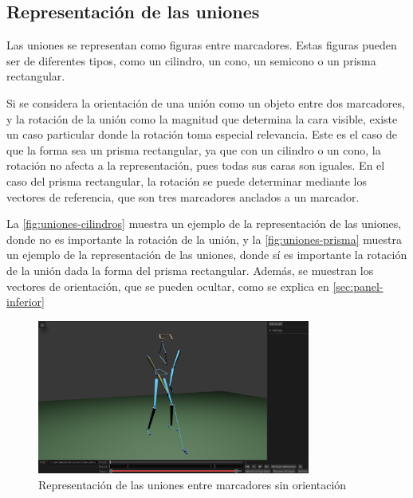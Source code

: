 \subsection{Representación de las uniones} \label{sec:representacion-uniones}

Las uniones se representan como figuras entre marcadores. Estas figuras pueden ser de diferentes tipos, como un cilindro, un cono, un semicono o un prisma rectangular.

Si se considera la orientación de una unión como un objeto entre dos marcadores, y la rotación de la unión como la magnitud que determina la cara visible, existe un caso particular donde la rotación toma especial relevancia. Este es el caso de que la forma sea un prisma rectangular, ya que con un cilindro o un cono, la rotación no afecta a la representación, pues todas sus caras son iguales. En el caso del prisma rectangular, la rotación se puede determinar mediante los vectores de referencia, que son tres marcadores anclados a un marcador. 

La \autoref{fig:uniones-cilindros} muestra un ejemplo de la representación de las uniones, donde no es importante la rotación de la unión, y la \autoref{fig:uniones-prisma} muestra un ejemplo de la representación de las uniones, donde sí es importante la rotación de la unión dada la forma del prisma rectangular. Además, se muestran los vectores de orientación, que se pueden ocultar, como se explica en \autoref{sec:panel-inferior}

\begin{figure}[H]
  \centering
  \includegraphics[width=0.8\textwidth]{imagenes/uniones-cilindros.png}
  \caption{Representación de las uniones entre marcadores sin orientación}
  \label{fig:uniones-cilindros}
\end{figure}



